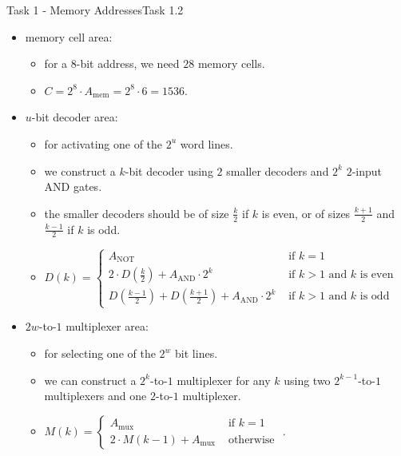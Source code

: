 \begin{frame}[allowframebreaks]{Task 1 - Memory Addresses}{Task 1.2\vspace{0.25cm}}
  \begin{itemize}
    \item \alert{memory cell area:}
    \begin{itemize}
      \item for a $8$-\alert{bit address}, we need $28$ \alert{memory cells}.
      \item $C=2^8 \cdot A_{\mathrm{mem}}=2^8 \cdot 6=1536$.
    \end{itemize}
    \item \alert{$u$-bit decoder area:}
    \begin{itemize}
      \item for activating one of the $2^u$ \alert{word lines}.
      \item we construct a $k$-bit decoder using $2$ \alert{smaller decoders} and $2^k$ $2$-input \alert{AND gates}.
      \item the \alert{smaller decoders} should be of size $\frac{k}{2}$ if $k$ is \alert{even}, or of sizes $\frac{k + 1}{2}$ and $\frac{k - 1}{2}$ if $k$ is \alert{odd}.
      \item $D(k)= \begin{cases}A_{\mathrm{NOT}} & \text { if } k=1 \\ 2 \cdot D\left(\frac{k}{2}\right)+A_{\mathrm{AND}} \cdot 2^k & \text { if } k>1 \text { and } k \text { is even } \\ D\left(\frac{k-1}{2}\right)+D\left(\frac{k+1}{2}\right)+A_{\mathrm{AND}} \cdot 2^k & \text { if } k>1 \text { and } k \text { is odd }\end{cases}$
    \end{itemize}
    \item \alert{$2w$-to-$1$ multiplexer area:}
    \begin{itemize}
      \item  for selecting one of the $2^w$ \alert{bit lines}.
      \item  we can construct a $2^k$-to-$1$ \alert{multiplexer} for any $k$ using two $2^{k-1}$-to-$1$ \alert{multiplexers} and one $2$-to-$1$ \alert{multiplexer}.
      \item $M(k)= \begin{cases}A_{\operatorname{mux}} & \text { if } k=1 \\ 2 \cdot M(k-1)+A_{\operatorname{mux}} & \text { otherwise }\end{cases}$.

\end{itemize}
\end{itemize}
\end{frame}
